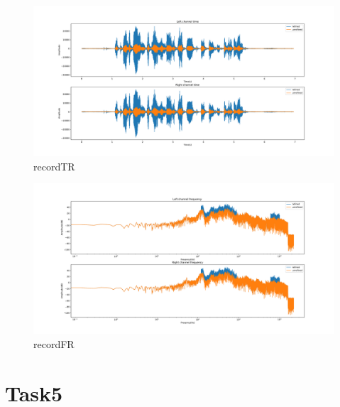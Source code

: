 \documentclass[a4paper,12pt]{article}
\begin{document}
\begin{figure}[h]   
	\centering 
	\includegraphics[width=12cm]{../Output/Figures/recordTR.pdf} 
	\caption{recordTR}   
	\label{fig_recordTR}
\end{figure}
\begin{figure}[h]   
	\centering 
	\includegraphics[width=12cm]{../Output/Figures/recordFR.pdf} 
	\caption{recordFR}   
	\label{fig_recordFR}
\end{figure}

\clearpage
\section{Task5}
\end{document}
